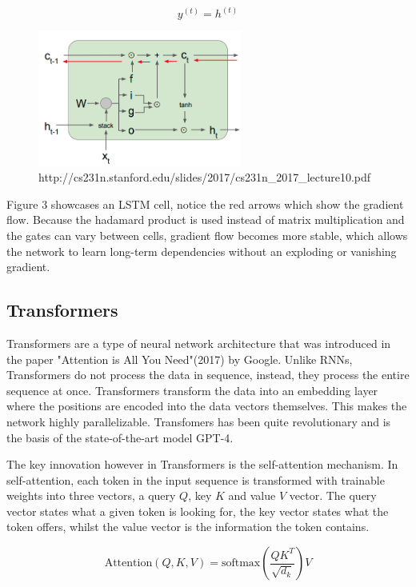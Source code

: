 \documentclass[11pt]{article}
\begin{document}
\begin{equation} y^{(t)} = h^{(t)} \end{equation}

\begin{figure}[h]
\centering
\includegraphics[width=0.6\textwidth]{lstm_diagram.png}
\caption{http://cs231n.stanford.edu/slides/2017/cs231n\_2017\_lecture10.pdf}
\end{figure}

Figure 3 showcases an LSTM cell, notice the red arrows which show the gradient flow. Because the hadamard product is used instead of matrix multiplication and the gates can vary between cells, gradient flow becomes more stable, which allows the network to learn long-term dependencies without an exploding or vanishing gradient.
\subsection{Transformers}

Transformers are a type of neural network architecture that was introduced in the paper "Attention is All You Need"(2017) by Google. Unlike RNNs, Transformers do not process the data in sequence, instead, they process the entire sequence at once. Transformers transform the data into an embedding layer where the positions are encoded into the data vectors themselves. This makes the network highly parallelizable. Transfomers has been quite revolutionary and is the basis of the state-of-the-art model GPT-4.

The key innovation however in Transformers is the self-attention mechanism. In self-attention, each token in the input sequence is transformed with trainable weights into three vectors, a query $Q$, key $K$ and value $V$ vector. The query vector states what a given token is looking for, the key vector states what the token offers, whilst the value vector is the information the token contains.

$$\text{Attention}(Q, K , V) = \text{softmax}(\frac{QK^T}{\sqrt{d_k}})V$$
\end{document}

